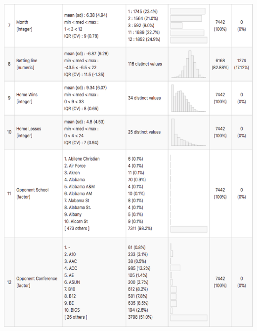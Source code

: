 \documentclass[preprint,12pt,times]{elsarticle}
\begin{document}
\includegraphics [width=\linewidth, height=21cm]{Picture8.png}
\newpage
\end{document}
